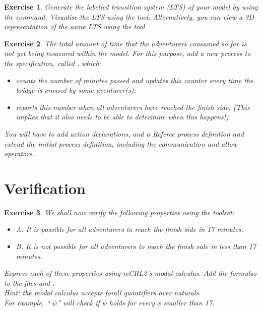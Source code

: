 \documentclass[11pt]{article}
\theoremstyle{myplain}
\newtheorem{exercise}{Exercise}
\theoremstyle{definition} %
\begin{document}
\begin{exercise}
  Generate the labelled transition system (LTS) of your model by using the  command.
Visualise the LTS using the  tool.
Alternatively, you can view a 3D representation of the same LTS using the  tool.
\end{exercise}


\begin{exercise}
The total amount of time that the adventurers consumed so far is not yet being measured within the model. For this purpose, add a new process to the specification, called , which:
\begin{itemize}
  \item counts the number of minutes passed and updates this counter every time the bridge is crossed by some aventurer(s);
  \item reports this number when all adventurers have reached the \emph{finish side}. (This implies that it also needs to be able to determine when this happens!)
\end{itemize}
You will have to add action declarations, and a \emph{Referee} process definition and extend the initial process definition, including the communication and allow operators.
\end{exercise}


\section*{Verification}

\begin{exercise}
We shall now verify the following properties using the toolset:
\begin{itemize}
  \item A. It is possible for all adventurers to reach the finish side in 17 minutes.
  \item B. It is not possible for all adventurers to reach the finish side in less than 17 minutes.
\end{itemize}

Express each of these properties using mCRL2's modal calculus. Add the formulas to the files  and .
\\[2mm]
\emph{Hint: the modal calculus accepts forall quantifiers over naturals.}
\\\emph{For example, `` $\psi$'' will check if $\psi$ holds for every $x$ smaller than 17.}
\end{exercise}
\end{document}
